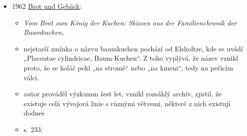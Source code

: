 \begin{itemize}
  \begin{itemize}
  \tightlist
  \item
    \emph{Wie der Prügelkrapfen gebacken wird},
  \item
     
  \item
    s. 35

    \begin{itemize}
    \tightlist
    \item
      byl oblíbený ve Štýrsku, známej i v Korutanech a Dolních i Horních
      Rakousích
    \item
      staré zprávy jsou často nejasné ohledně receptu, takže bez ústního
      předávání tradice by ho dneska dokázal připravit málokdo
    \item
      popisujou, jak ve vesnici  ve Štýrsku
      připravovali trdelník k 80. narozeninám místní učitelky Betty
      Hinterer
    \item
      oheň dělali v dílně místního kováře a válec zapůjčilo muzeum v
      Trautenfelsu
    \item
      pak popisujou jak forma vypadá, má kliku a speciální stojan
    \item
      matka paní Marie Schwab upekla za život přes sto těchto moučníků
    \item
      následuje recept
    \item
      po upečení se nechá vychladnout do dalšího dne, odříznou se okraje
      a za pomoci provázku se stáhne. pak se ozdobí bílkovou polevou.
    \end{itemize}
  \item
    před článkem se nachází obrázková příloha, kde je vidět, jak se
    hustě navíjí provázek na válec, pak i stojan a samotný pečení před
    ohněm
  \end{itemize}
\item
  1962
  \href{https://web.archive.org/web/20201229075721/http://www.kurtos.eu/dl/BS-UB-WEB-11322.pdf}{Brot
  und Gebäck}:

  \begin{itemize}
  \tightlist
  \item
    \emph{Vom Brot zum König der Kuchen: Skizzen aus der Familienchronik
    der Baumkuchen}, 
  \item
    nejstarší zmínka o názvu baumkuchen pochází od Elsholtze, kde se
    uvádí „Placentae cylindricae, Baum-Kuchen``. Z toho vyplývá, že
    název vznikl proto, že se koláč pekl „na stromě`` nebo „na kmeni``,
    tedy na pečicím válci.
  \item
    autor prováděl výzkumm šest let, vznikl rozsáhlý archiv, zjistil, že
    existuje celá vývojová linie s různými větvemi, některé z nich
    existují dodnes
  \item
    s. 233:


\end{itemize}
\end{itemize}

